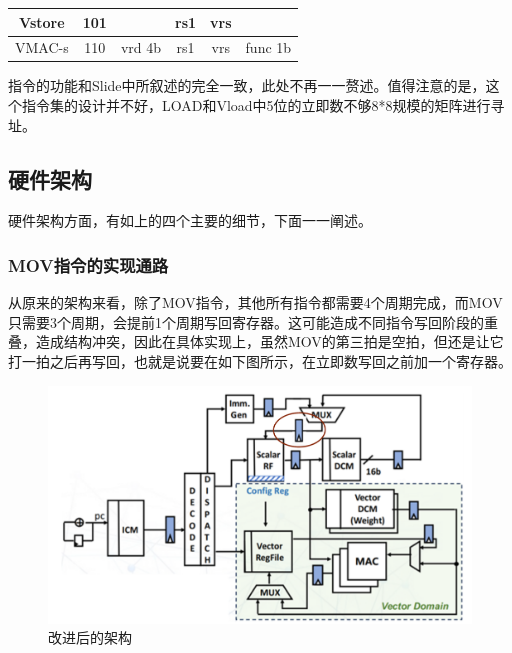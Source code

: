 \documentclass{article}
\begin{document}
\begin{table}[!ht]
\begin{tabular}{|c|ccc|cccc|ccccccccc|}
    \cellcolor[HTML]{FFFFFF}Vstore & \multicolumn{3}{c|}{101}                               & \multicolumn{4}{l|}{\cellcolor[HTML]{000000}{\color[HTML]{000000} }}            & \multicolumn{4}{c|}{rs1}                                                                          & \multicolumn{4}{c|}{vrs}                                                                          & \multicolumn{1}{l|}{\cellcolor[HTML]{330001}} \\ \hline
    \cellcolor[HTML]{FFFFFF}VMAC-s & \multicolumn{3}{c|}{110}                               & \multicolumn{4}{c|}{vrd 4b}                                                     & \multicolumn{4}{c|}{rs1}                                                                          & \multicolumn{4}{c|}{vrs}                                                                          & func 1b                                       \\ \hline
    \end{tabular}
    \end{table}
    
    指令的功能和Slide中所叙述的完全一致，此处不再一一赘述。值得注意的是，这个指令集的设计并不好，LOAD和Vload中5位的立即数不够8*8规模的矩阵进行寻址。
\subsection{硬件架构}
    硬件架构方面，有如上的四个主要的细节，下面一一阐述。
    \subsubsection{MOV指令的实现通路}
    从原来的架构来看，除了MOV指令，其他所有指令都需要4个周期完成，而MOV只需要3个周期，会提前1个周期写回寄存器。这可能造成不同指令写回阶段的重叠，造成结构冲突，因此在具体实现上，虽然MOV的第三拍是空拍，但还是让它打一拍之后再写回，也就是说要在如下图所示，在立即数写回之前加一个寄存器。

    \begin{figure}[!ht]
        \centering
        \includegraphics[width = \textwidth]{Arch2.png}
        \caption{改进后的架构}
    \end{figure}
\end{document}
